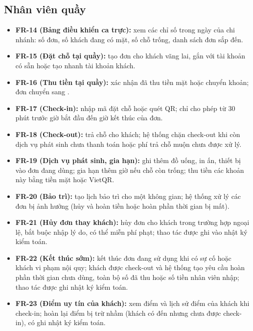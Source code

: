 \subsection{Nhân viên quầy}
\begin{itemize}
    \item \textbf{FR-14 (Bảng điều khiển ca trực):} xem các chỉ số trong ngày của chi nhánh: số đơn, số khách đang có mặt, số chỗ trống, danh sách đơn sắp đến.
    \item \textbf{FR-15 (Đặt chỗ tại quầy):} tạo đơn cho khách vãng lai, gắn với tài khoản có sẵn hoặc tạo nhanh tài khoản khách.
    \item \textbf{FR-16 (Thu tiền tại quầy):} xác nhận đã thu tiền mặt hoặc chuyển khoản; đơn chuyển sang .
    \item \textbf{FR-17 (Check-in):} nhập mã đặt chỗ hoặc quét QR; chỉ cho phép từ 30 phút trước giờ bắt đầu đến giờ kết thúc của đơn.
    \item \textbf{FR-18 (Check-out):} trả chỗ cho khách; hệ thống chặn check-out khi còn dịch vụ phát sinh chưa thanh toán hoặc phí trả chỗ muộn chưa được xử lý.
    \item \textbf{FR-19 (Dịch vụ phát sinh, gia hạn):} ghi thêm đồ uống, in ấn, thiết bị vào đơn đang dùng; gia hạn thêm giờ nếu chỗ còn trống; thu tiền các khoản này bằng tiền mặt hoặc VietQR.
    \item \textbf{FR-20 (Bảo trì):} tạo lịch bảo trì cho một không gian; hệ thống xử lý các đơn bị ảnh hưởng (hủy và hoàn tiền hoặc hoàn phần thời gian bị mất).
    \item \textbf{FR-21 (Hủy đơn thay khách):} hủy đơn cho khách trong trường hợp ngoại lệ, bắt buộc nhập lý do, có thể miễn phí phạt; thao tác được ghi vào nhật ký kiểm toán.
    \item \textbf{FR-22 (Kết thúc sớm):} kết thúc đơn đang sử dụng khi có sự cố hoặc khách vi phạm nội quy; khách được check-out và hệ thống tạo yêu cầu hoàn phần thời gian chưa dùng, toàn bộ số đã thu hoặc số tiền nhân viên nhập; thao tác được ghi nhật ký kiểm toán.
    \item \textbf{FR-23 (Điểm uy tín của khách):} xem điểm và lịch sử điểm của khách khi check-in; hoàn lại điểm bị trừ nhầm (khách có đến nhưng chưa được check-in), có ghi nhật ký kiểm toán.
\end{itemize}

